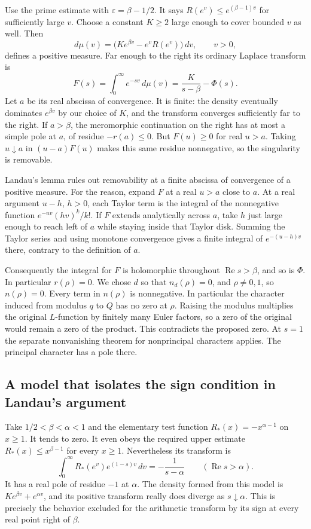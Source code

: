 \documentclass[11pt,letterpaper]{article}
\renewcommand{\Re}{\operatorname{Re}}
\begin{document}
Use the prime estimate with $\varepsilon=\beta-1/2$. It says
$R(e^v)\le e^{(\beta-1)v}$ for sufficiently large $v$. Choose a constant \(K\ge2\) large enough to cover bounded \(v\) as well. Then
\[
 d\mu(v)=\bigl(K e^{\beta v}-e^v R(e^v)\bigr)\,dv,
 \qquad v>0,
\]
defines a positive measure. Far enough to the right its ordinary Laplace
transform is
\[
 F(s)=\int_0^\infty e^{-sv}\,d\mu(v)
      =\frac{K}{s-\beta}-\Phi(s).
\]
Let \(a\) be its real abscissa of convergence. It is finite: the density eventually dominates \(e^{\beta v}\) by our choice of \(K\), and the transform converges sufficiently far to the right. If $a>\beta$, the
meromorphic continuation on the right has at most a simple pole at
$a$, of residue $-r(a)\le0$. But $F(u)\ge0$ for real $u>a$. Taking
$u\downarrow a$ in $(u-a)F(u)$ makes this same residue nonnegative,
so the singularity is removable.

Landau's lemma rules out removability at a finite abscissa of convergence
of a positive measure. For the reason, expand $F$ at a real $u>a$ close
to $a$. At a real argument $u-h$, $h>0$, each Taylor term is the integral
of the nonnegative function $e^{-uv}(hv)^k/k!$. If $F$ extends
analytically across $a$, take $h$ just large enough to reach left of $a$
while staying inside that Taylor disk. Summing the Taylor series and using
monotone convergence gives a finite integral of $e^{-(u-h)v}$ there,
contrary to the definition of $a$.

Consequently the integral for $F$ is holomorphic throughout $\Re s>\beta$,
and so is $\Phi$. In particular $r(\rho)=0$. We chose $d$ so that
$n_d(\rho)=0$, and $\rho\ne0,1$, so $n(\rho)=0$. Every term in $n(\rho)$
is nonnegative. In particular the character induced from modulus $q$ to
$Q$ has no zero at $\rho$. Raising the modulus multiplies the original
$L$-function by finitely many Euler factors, so a zero of the original would
remain a zero of the product. This contradicts the proposed zero. At
$s=1$ the separate nonvanishing theorem for nonprincipal characters
applies. The principal character has a pole there.

\subsection{A model that isolates the sign condition in Landau's argument}
\label{sec:landau-sign-example}

Take \(1/2<\beta<\alpha<1\) and the elementary test function \(R_*(x)=-x^{\alpha-1}\) on \(x\ge1\). It tends to zero. It even obeys the required upper estimate \(R_*(x)\le x^{\beta-1}\) for every \(x\ge1\). Nevertheless its transform is
\[
   \int_0^\infty R_*(e^v)e^{(1-s)v}\,dv=-\frac1{s-\alpha}
           \qquad(\Re s>\alpha).
\]
It has a real pole of residue \(-1\) at \(\alpha\). The density formed from this model is \(K e^{\beta v}+e^{\alpha v}\), and its positive transform really does diverge as \(s\downarrow\alpha\). This is precisely the behavior excluded for the arithmetic transform by its sign at every real point right of \(\beta\).
\end{document}

